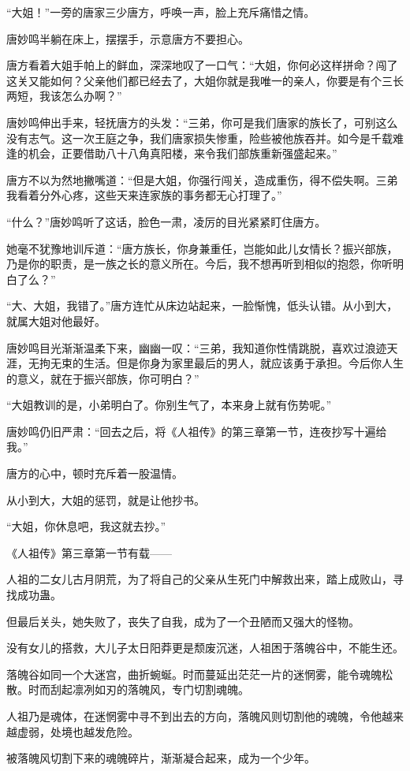 \begin{this_body}
“大姐！”一旁的唐家三少唐方，呼唤一声，脸上充斥痛惜之情。

唐妙鸣半躺在床上，摆摆手，示意唐方不要担心。

唐方看着大姐手帕上的鲜血，深深地叹了一口气：“大姐，你何必这样拼命？闯了这关又能如何？父亲他们都已经去了，大姐你就是我唯一的亲人，你要是有个三长两短，我该怎么办啊？”

唐妙鸣伸出手来，轻抚唐方的头发：“三弟，你可是我们唐家的族长了，可别这么没有志气。这一次王庭之争，我们唐家损失惨重，险些被他族吞并。如今是千载难逢的机会，正要借助八十八角真阳楼，来令我们部族重新强盛起来。”

唐方不以为然地撇嘴道：“但是大姐，你强行闯关，造成重伤，得不偿失啊。三弟我看着分外心疼，这些天来连家族的事务都无心打理了。”

“什么？”唐妙鸣听了这话，脸色一肃，凌厉的目光紧紧盯住唐方。

她毫不犹豫地训斥道：“唐方族长，你身兼重任，岂能如此儿女情长？振兴部族，乃是你的职责，是一族之长的意义所在。今后，我不想再听到相似的抱怨，你听明白了么？”

“大、大姐，我错了。”唐方连忙从床边站起来，一脸惭愧，低头认错。从小到大，就属大姐对他最好。

唐妙鸣目光渐渐温柔下来，幽幽一叹：“三弟，我知道你性情跳脱，喜欢过浪迹天涯，无拘无束的生活。但是你身为家里最后的男人，就应该勇于承担。今后你人生的意义，就在于振兴部族，你可明白？”

“大姐教训的是，小弟明白了。你别生气了，本来身上就有伤势呢。”

唐妙鸣仍旧严肃：“回去之后，将《人祖传》的第三章第一节，连夜抄写十遍给我。”

唐方的心中，顿时充斥着一股温情。

从小到大，大姐的惩罚，就是让他抄书。

“大姐，你休息吧，我这就去抄。”

《人祖传》第三章第一节有载——

人祖的二女儿古月阴荒，为了将自己的父亲从生死门中解救出来，踏上成败山，寻找成功蛊。

但最后关头，她失败了，丧失了自我，成为了一个丑陋而又强大的怪物。

没有女儿的搭救，大儿子太日阳莽更是颓废沉迷，人祖困于落魄谷中，不能生还。

落魄谷如同一个大迷宫，曲折蜿蜒。时而蔓延出茫茫一片的迷惘雾，能令魂魄松散。时而刮起凛冽如刃的落魄风，专门切割魂魄。

人祖乃是魂体，在迷惘雾中寻不到出去的方向，落魄风则切割他的魂魄，令他越来越虚弱，处境也越发危险。

被落魄风切割下来的魂魄碎片，渐渐凝合起来，成为一个少年。


\end{this_body}
